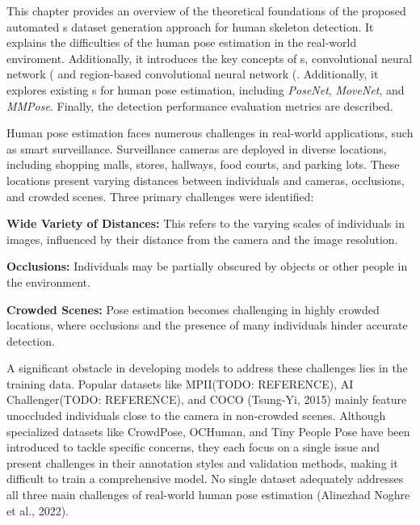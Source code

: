 This chapter provides an overview of the theoretical foundations of the proposed automated \NN\-s dataset generation approach for human skeleton detection. It explains the difficulties of the human pose estimation in the real-world enviroment. Additionally, it introduces the key concepts of \NN\-s, convolutional neural network (\CNN\) and region-based convolutional neural network (\RCNN\). Additionally, it explores existing \NN\-s for human pose estimation, including {\em PoseNet}, {\em MoveNet}, and {\em MMPose}. Finally, the detection performance evaluation metrics are described.

Human pose estimation faces numerous challenges in real-world applications, such as smart surveillance. Surveillance cameras are deployed in diverse locations, including shopping malls, stores, hallways, food courts, and parking lots. These locations present varying distances between individuals and cameras, occlusions, and crowded scenes. Three primary challenges were identified:

\startitemize[n]
    \item {\bf Wide Variety of Distances:} This refers to the varying scales of individuals in images, influenced by their distance from the camera and the image resolution.
    \item {\bf Occlusions:} Individuals may be partially obscured by objects or other people in the environment.
    \item {\bf Crowded Scenes:} Pose estimation becomes challenging in highly crowded locations, where occlusions and the presence of many individuals hinder accurate detection.
\stopitemize

A significant obstacle in developing models to address these challenges lies in the training data. Popular datasets like MPII(TODO: REFERENCE), AI Challenger(TODO: REFERENCE), and COCO (\scc Tsung-Yi, 2015) mainly feature unoccluded individuals close to the camera in non-crowded scenes. Although specialized datasets like CrowdPose, OCHuman, and Tiny People Pose have been introduced to tackle specific concerns, they each focus on a single issue and present challenges in their annotation styles and validation methods, making it difficult to train a comprehensive model. No single dataset adequately addresses all three main challenges of real-world human pose estimation (\scc Alinezhad Noghre et al., 2022).

